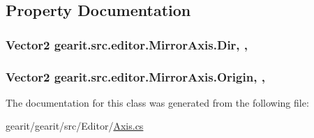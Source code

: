 \subsection{Property Documentation}
\hypertarget{classgearit_1_1src_1_1editor_1_1_mirror_axis_a44b7cd25add064c30544d98d7a766659}{
\subsubsection[{Dir}]{\setlength{\rightskip}{0pt plus 5cm}Vector2 gearit.\+src.\+editor.\+Mirror\+Axis.\+Dir\hspace{0.3cm}{\ttfamily [static]}, {\ttfamily [get]}, {\ttfamily [set]}}}\label{classgearit_1_1src_1_1editor_1_1_mirror_axis_a44b7cd25add064c30544d98d7a766659}
\hypertarget{classgearit_1_1src_1_1editor_1_1_mirror_axis_a8db69309b20550d60ffd191e3b097dec}{
\subsubsection[{Origin}]{\setlength{\rightskip}{0pt plus 5cm}Vector2 gearit.\+src.\+editor.\+Mirror\+Axis.\+Origin\hspace{0.3cm}{\ttfamily [static]}, {\ttfamily [get]}, {\ttfamily [set]}}}\label{classgearit_1_1src_1_1editor_1_1_mirror_axis_a8db69309b20550d60ffd191e3b097dec}


The documentation for this class was generated from the following file\+:\begin{DoxyCompactItemize}
\item 
gearit/gearit/src/\+Editor/\hyperlink{_axis_8cs}{Axis.\+cs}\end{DoxyCompactItemize}
